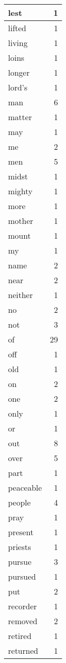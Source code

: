 \begin{center}
\begin{longtable}{l|r}
lest & 1 \\ \hline
lifted & 1 \\ \hline
living & 1 \\ \hline
loins & 1 \\ \hline
longer & 1 \\ \hline
lord's & 1 \\ \hline
man & 6 \\ \hline
matter & 1 \\ \hline
may & 1 \\ \hline
me & 2 \\ \hline
men & 5 \\ \hline
midst & 1 \\ \hline
mighty & 1 \\ \hline
more & 1 \\ \hline
mother & 1 \\ \hline
mount & 1 \\ \hline
my & 1 \\ \hline
name & 2 \\ \hline
near & 2 \\ \hline
neither & 1 \\ \hline
no & 2 \\ \hline
not & 3 \\ \hline
of & 29 \\ \hline
off & 1 \\ \hline
old & 1 \\ \hline
on & 2 \\ \hline
one & 2 \\ \hline
only & 1 \\ \hline
or & 1 \\ \hline
out & 8 \\ \hline
over & 5 \\ \hline
part & 1 \\ \hline
peaceable & 1 \\ \hline
people & 4 \\ \hline
pray & 1 \\ \hline
present & 1 \\ \hline
priests & 1 \\ \hline
pursue & 3 \\ \hline
pursued & 1 \\ \hline
put & 2 \\ \hline
recorder & 1 \\ \hline
removed & 2 \\ \hline
retired & 1 \\ \hline
returned & 1 \\ \hline

\end{longtable}
\end{center}

